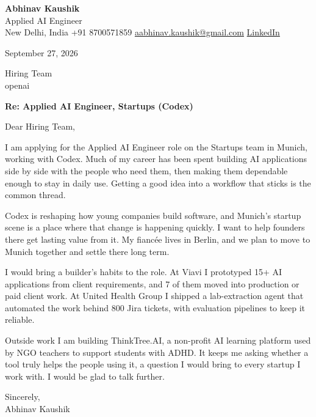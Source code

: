 \documentclass[11pt,a4paper]{article}
\begin{document}
{\Large\bfseries Abhinav Kaushik}\\
Applied AI Engineer\\
New Delhi, India \textbar{} +91 8700571859 \textbar{} \href{mailto:aabhinav.kaushik@gmail.com}{aabhinav.kaushik@gmail.com} \textbar{} \href{https://www.linkedin.com/in/abhinav-kaushik10/}{LinkedIn}  

September 27, 2026

Hiring Team\\
openai

\textbf{Re: Applied AI Engineer, Startups (Codex)}

Dear Hiring Team,

I am applying for the Applied AI Engineer role on the Startups team in Munich, working with Codex. Much of my career has been spent building AI applications side by side with the people who need them, then making them dependable enough to stay in daily use. Getting a good idea into a workflow that sticks is the common thread.

Codex is reshaping how young companies build software, and Munich's startup scene is a place where that change is happening quickly. I want to help founders there get lasting value from it. My fiancée lives in Berlin, and we plan to move to Munich together and settle there long term.

I would bring a builder's habits to the role. At Viavi I prototyped 15+ AI applications from client requirements, and 7 of them moved into production or paid client work. At United Health Group I shipped a lab-extraction agent that automated the work behind 800 Jira tickets, with evaluation pipelines to keep it reliable.

Outside work I am building ThinkTree.AI, a non-profit AI learning platform used by NGO teachers to support students with ADHD. It keeps me asking whether a tool truly helps the people using it, a question I would bring to every startup I work with. I would be glad to talk further.

Sincerely,\\[4pt]
Abhinav Kaushik
\end{document}
